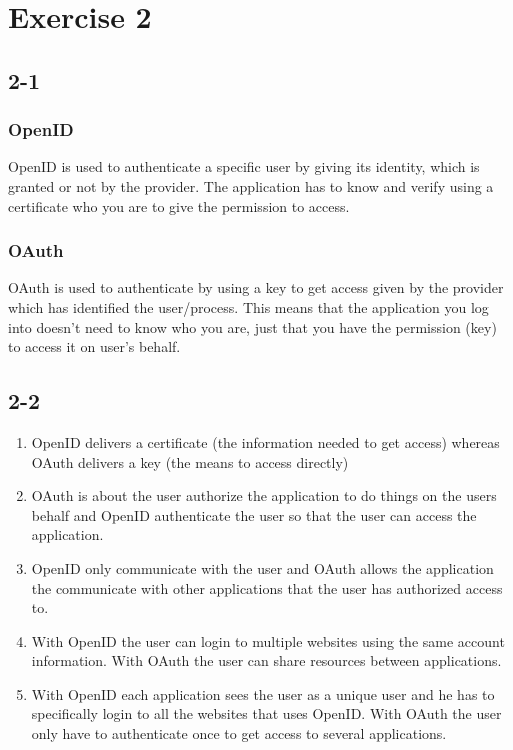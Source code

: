 \documentclass[12pt]{article}
\begin{document}
\section*{Exercise 2}
\subsection*{2-1}
\subsubsection*{OpenID}
OpenID is used to authenticate a specific user by giving its identity, which is granted or not by the provider. The application has to know and verify using a certificate who you are to give the permission to access.

\subsubsection*{OAuth}
OAuth is used to authenticate by using a key to get access given by the provider which has identified the user/process. This means that the application you log into doesn't need to know who you are, just that you have the permission (key) to access it on user's behalf.

\subsection*{2-2}
\begin{enumerate}
\item OpenID delivers a certificate (the information needed to get access) whereas OAuth delivers a key (the means to access directly)
\item OAuth is about the user authorize the application to do things on the users behalf and OpenID authenticate the user so that the user can access the application.
\item OpenID only communicate with the user and OAuth allows the application the communicate with other applications that the user has authorized access to. 
\item With OpenID the user can login to multiple websites using the same account information. With OAuth the user can share resources between applications.
\item With OpenID each application sees the user as a unique user and he has to specifically login to all the websites that uses OpenID. With OAuth the user only have to authenticate once to get access to several applications. 
\end{enumerate}
\end{document}
